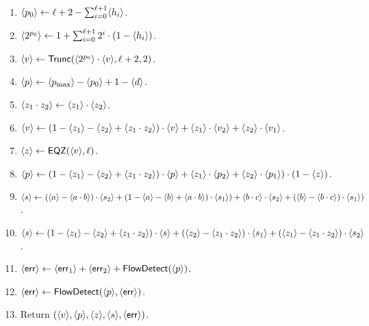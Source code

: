 \begin{enumerate}
\item $\langle p_0 \rangle \leftarrow \ell+2-\sum_{i=0}^{\ell+1} \langle h_i \rangle$.
\item $\langle 2^{p_0} \rangle \leftarrow 1+ \sum_{i=0}^{\ell+1} 2^i \cdot (1-\langle h_i \rangle)$.
\item $\langle v \rangle \leftarrow \mathsf{Trunc}(\langle 2^{p_0} \rangle \cdot \langle v \rangle,\ell+2,2)$.
\item $\langle p \rangle \leftarrow \langle p_{\max} \rangle-\langle p_0 \rangle+1-\langle d \rangle$.
\item $\langle z_1 \cdot z_2 \rangle \leftarrow \langle z_1 \rangle \cdot \langle z_2 \rangle$.
\item $\langle v \rangle \leftarrow (1-\langle z_1 \rangle-\langle z_2 \rangle +\langle z_1 \cdot z_2 \rangle) \cdot \langle v \rangle
		    + \langle z_1 \rangle \cdot \langle v_2 \rangle + \langle z_2 \rangle \cdot \langle v_1 \rangle$.
\item $\langle z \rangle \leftarrow \mathsf{EQZ}(\langle v \rangle,\ell)$.
\item $\langle p \rangle \leftarrow (1-\langle z_1 \rangle-\langle z_2 \rangle+\langle z_1 \cdot z_2 \rangle) \cdot \langle p \rangle
	+ \langle z_1 \rangle \cdot \langle p_2 \rangle 
	+ \langle z_2 \rangle \cdot \langle p_1 \rangle) \cdot (1-\langle z \rangle)$.
\item $\langle s \rangle \leftarrow (\langle a \rangle-\langle a \cdot b \rangle) \cdot \langle s_2 \rangle
	             + (1-\langle a \rangle-\langle b \rangle+\langle a \cdot b \rangle) \cdot \langle s_1 \rangle)
		     + \langle b \cdot c \rangle \cdot \langle s_2 \rangle
		     + (\langle b \rangle-\langle b \cdot c \rangle) \cdot \langle s_1 \rangle)$.
\item $\langle s \rangle \leftarrow (1-\langle z_1 \rangle-\langle z_2 \rangle+\langle z_1 \cdot z_2 \rangle) \cdot \langle s \rangle
	             + (\langle z_2 \rangle-\langle z_1 \cdot z_2 \rangle) \cdot \langle s_1 \rangle
		     + (\langle z_1 \rangle-\langle z_1 \cdot z_2 \rangle) \cdot \langle s_2 \rangle$.
\item $\langle \mathsf{err} \rangle \leftarrow \langle \mathsf{err}_1 \rangle + \langle \mathsf{err}_2 \rangle + \mathsf{FlowDetect}(\langle p \rangle)$.
\item $\langle \mathsf{err} \rangle \leftarrow \mathsf{FlowDetect}(\langle p \rangle,\langle \mathsf{err} \rangle)$.
\item Return $(\langle v \rangle,\langle p \rangle,\langle z \rangle,\langle s \rangle,\langle \mathsf{err} \rangle)$.
\end{enumerate}

